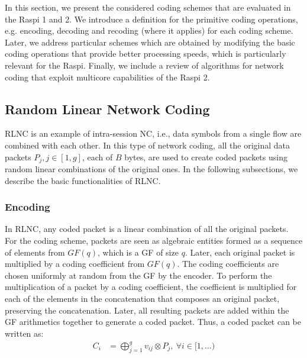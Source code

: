 \label{sec:schemes}

In this section, we present the considered coding schemes that are evaluated
in the \ac{Raspi} 1 and 2.
We introduce a
definition for the primitive coding operations, e.g. encoding,
decoding and recoding (where it applies) for each coding
scheme. Later, we address particular schemes which are obtained by
modifying the basic coding operations that provide better processing
speeds, which is particularly relevant for the \ac{Raspi}.  Finally,
we include a review of algorithms for network coding that exploit
multicore capabilities of the \ac{Raspi} 2.


\subsection{Random Linear Network Coding}
\label{ssec:RLNC}

\ac{RLNC} is an example of intra-session \ac{NC}, i.e., data symbols
from a single flow are combined with each other. In this type of
network coding, all the original data packets $P_j, j \in [1,g]$, each
of $B$ bytes, are used to create coded packets using random linear
combinations of the original ones. In the following subsections, we
describe the basic functionalities of \ac{RLNC}.

\subsubsection{Encoding}
In \ac{RLNC}, any coded packet is a linear combination of all
the original packets. For the coding scheme, packets are seen as
algebraic entities formed as a sequence of elements from $GF(q)$,
which is a \ac{GF} of size $q$. Later, each original packet is
multiplied by a coding coefficient from $GF(q)$. The coding coefficients
are chosen uniformly at random from the \ac{GF} by the encoder. To
perform the multiplication of a packet by a coding coefficient, the
coefficient is multiplied for each of the elements in the
concatenation that composes an original packet, preserving the
concatenation. Later, all resulting packets are added within the
\ac{GF} arithmetics together to generate a coded packet. Thus, a
coded packet can be written as:
%
\begin{align} \label{eq:coded_packet}
C_i  &= \bigoplus_{j=1}^{g} v_{ij} \otimes P_j ,\ \forall i \in [1,\ldots)
\end{align}

